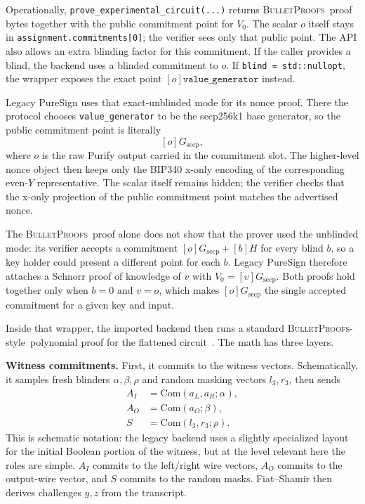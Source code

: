 \documentclass[11pt]{article}
\DeclareRobustCommand{\bp}{{\normalfont\scshape BulletProofs}}
\begin{document}
Operationally, \texttt{prove\_experimental\_circuit(...)} returns \bp\ proof bytes together
with the public commitment point for $V_0$. The scalar $o$ itself stays in
\texttt{assignment.commitments[0]}; the verifier sees only that public point. The API also allows
an extra blinding factor for this commitment. If the caller provides a blind, the backend uses a blinded
commitment to $o$. If \texttt{blind = std::nullopt}, the wrapper exposes the exact point
$[o]\texttt{value\_generator}$ instead.

Legacy PureSign uses that exact-unblinded mode for its nonce proof. There the protocol chooses
\texttt{value\_generator} to be the secp256k1 base generator, so the public commitment point is
literally
\[
[o]G_{\mathrm{secp}},
\]
where $o$ is the raw Purify output carried in the commitment slot. The higher-level nonce object
then keeps only the BIP340 x-only encoding of the corresponding even-$Y$ representative. The scalar
itself remains hidden; the verifier checks that the x-only projection of the public commitment point
matches the advertised nonce.

The \bp\ proof alone does not show that the prover used the unblinded mode: its verifier accepts a
commitment $[o]G_{\mathrm{secp}} + [b]H$ for every blind $b$, so a key holder could present a
different point for each $b$. Legacy PureSign therefore attaches a Schnorr proof of knowledge of $v$
with $V_0 = [v]G_{\mathrm{secp}}$. Both proofs hold together only when $b = 0$ and $v = o$, which
makes $[o]G_{\mathrm{secp}}$ the single accepted commitment for a given key and input.

Inside that wrapper, the imported backend then runs a standard \bp-style\ polynomial proof
for the flattened circuit~\cite{bulletproofs}. The math has three layers.

\medskip\noindent\textbf{Witness commitments.}
First, it commits to the witness vectors. Schematically, it samples fresh blinders
$\alpha,\beta,\rho$ and random masking vectors $l_3,r_3$, then sends
\[
\begin{aligned}
A_I &= \mathrm{Com}(a_L,a_R;\alpha), \\
A_O &= \mathrm{Com}(a_O;\beta), \\
S   &= \mathrm{Com}(l_3,r_3;\rho).
\end{aligned}
\]
This is schematic notation: the legacy backend uses a slightly specialized layout for the initial
Boolean portion of the witness, but at the level relevant here the roles are simple. $A_I$ commits
to the left/right wire vectors, $A_O$ commits to the output-wire vector, and $S$ commits to the
random masks. Fiat--Shamir then derives challenges $y,z$ from the transcript.
\end{document}

